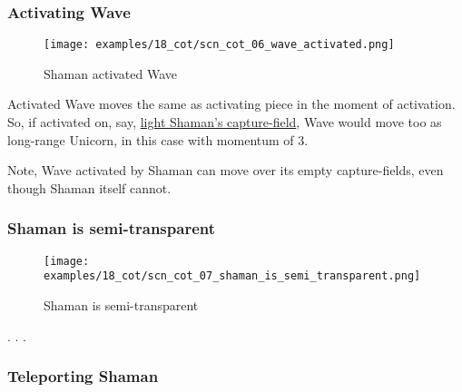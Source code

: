 \clearpage %

\subsubsection*{Activating Wave}
\label{sec:Conquest of Tlalocan/Shaman/Movement/Activating Wave}

\vspace*{-1.4\baselineskip}
\noindent
\begin{figure}[!h]
\texttt{[image: examples/18\_cot/scn\_cot\_06\_wave\_activated.png]}
\caption{Shaman activated Wave}
\label{fig:scn_cot_06_wave_activated}
\end{figure}

Activated Wave moves the same as activating piece in the moment of activation.
So, if activated on, say,
\hyperref[fig:scn_cot_03_light_shaman_capture_ply]{light Shaman's capture-field},
Wave would move too as long-range Unicorn, in this case with momentum of 3.

Note, Wave activated by Shaman can move over its empty capture-fields, even though
Shaman itself cannot.

\clearpage %

\subsubsection*{Shaman is semi-transparent}
\label{sec:Conquest of Tlalocan/Shaman/Movement/Shaman is semi-transparent}

\vspace*{-1.4\baselineskip}
\noindent
\begin{figure}[!h]
\texttt{[image: examples/18\_cot/scn\_cot\_07\_shaman\_is\_semi\_transparent.png]}
\caption{Shaman is semi-transparent}
\label{fig:scn_cot_07_shaman_is_semi_transparent}
\end{figure}

. . .

\clearpage %

\subsubsection*{Teleporting Shaman}
\label{sec:Conquest of Tlalocan/Shaman/Movement/Teleporting Shaman}


